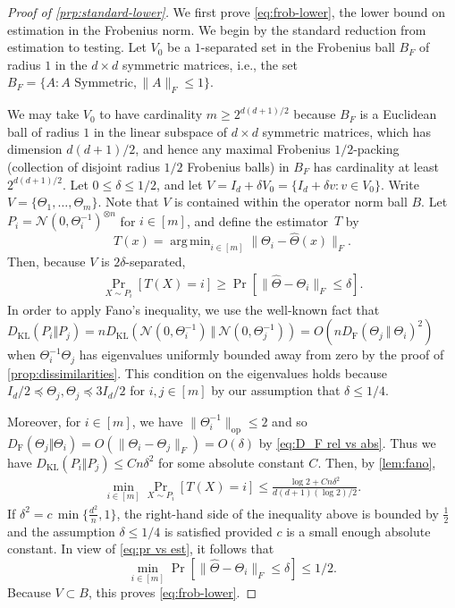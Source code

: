 \documentclass[aos]{imsart}
\theoremstyle{definition}
\numberwithin{equation}{section}
\DeclareMathOperator{\op}{op}
\DeclareMathOperator*{\argmin}{arg\,min}
\newcommand{\htheta}{\widehat{\Theta}}
\newcommand{\ot}{\otimes}
\newcommand{\DF}{D_{\operatorname{F}}}
\newcommand{\DKL}{D_{\operatorname{KL}}}
\begin{document}
\begin{proof}[Proof of \cref{prp:standard-lower}]
We first prove \cref{eq:frob-lower}, the lower bound on estimation in the Frobenius norm.
We begin by the standard reduction from estimation to testing.
Let $V_0$ be a $1$-separated set in the Frobenius ball $B_F$ of radius $1$ in the $d\times d$ symmetric matrices, i.e., the set $B_F = \{A: A \text{ Symmetric}, \|A\|_F \leq 1\}$.

We may take $V_0$ to have cardinality $m \geq 2^{d(d+1)/2}$ because $B_F$ is a Euclidean ball of radius $1$ in the linear subspace of $d\times d$ symmetric matrices, which has dimension $d(d+1)/2$, and hence any maximal Frobenius $1/2$-packing (collection of disjoint radius $1/2$ Frobenius balls) in $B_F$ has cardinality at least $2^{d(d+1)/2}$.
Let $0 \leq \delta \leq 1/2$, and let $V = I_d + \delta V_0 = \{I_d + \delta v: v \in V_0\}$.
Write $V = \{\Theta_1, \dots, \Theta_m\}$.
Note that $V$ is contained within the operator norm ball $B$.
Let $P_i =\mathcal{N}(0, \Theta^{-1}_i)^{\ot n}$ for $i\in[m]$, and define the estimator~$T$ by
\[ T(x) = \argmin_{i \in [m]} \|\Theta_i - \htheta(x)\|_F. \]
Then, because $V$ is $2\delta$-separated,
\begin{align}\label{eq:pr vs est}
  \Pr_{X \sim P_i} \left[T(X) = i\right] \geq \Pr\left[\|\htheta -  \Theta_i\|_F \leq \delta\right].
\end{align}
In order to apply Fano's inequality, we use the well-known fact that $\DKL(P_i\Vert  P_j) = n \DKL(\mathcal{N}(0, \Theta_i^{-1})\ \Vert  \ \mathcal{N}(0, \Theta_j^{-1})) = O(n\DF(\Theta_j \ \Vert  \ \Theta_i)^2)$ when $\Theta_i^{-1}\Theta_j$ has eigenvalues uniformly bounded away from zero by the proof of \cref{prop:dissimilarities}.
This condition on the eigenvalues holds because $I_d/2 \preceq \Theta_j, \Theta_j \preceq 3I_d/2$ for $i,j \in [m]$ by our assumption that $\delta \leq 1/4$.

Moreover, for $i \in [m]$, we have $\|\Theta_i^{-1}\|_{\op} \leq 2$ and so $\DF(\Theta_j\Vert  \Theta_i) = O( \|\Theta_i - \Theta_j\|_F) = O(\delta)$ by \cref{eq:D_F rel vs abs}.
Thus we have $\DKL(P_i\Vert  P_j) \leq Cn \delta^2$ for some absolute constant $C$.
Then, by \cref{lem:fano},
\begin{align*}
  \min_{i \in [m]} \Pr_{X \sim P_i}[T(X) = i] \leq \frac{  \log 2 + C n \delta^2}{d(d+1)(\log 2)/2 }.
\end{align*}
If $\delta^2 = c \, \min\{ \frac{d^2}{n}, 1\}$, the right-hand side of the inequality above is bounded by $\frac{1}{2}$ and the assumption $\delta \leq 1/4$ is satisfied provided $c$ is a small enough absolute constant.
In view of \cref{eq:pr vs est}, it follows that
\[ \min_{i \in [m]} \Pr\left[ \|\htheta - \Theta_i\|_F \leq \delta\right] \leq 1/2. \]
Because $V \subset B$, this proves \cref{eq:frob-lower}.


\end{proof}
\end{document}
